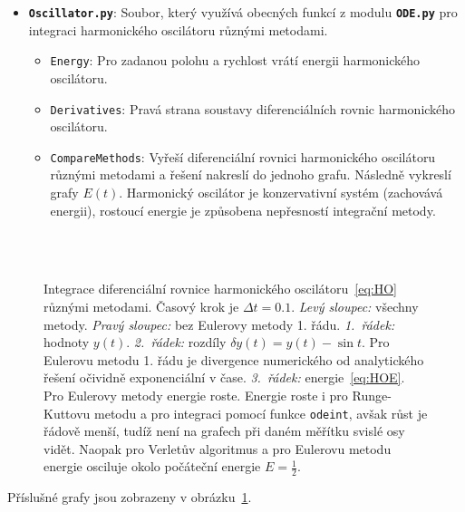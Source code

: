 \documentclass[a4paper,11pt,twoside]{article}
\def\code#1{\textnormal{\texttt{#1}}}
\def\file#1{\textnormal{\textbf{\texttt{#1}}}}
\begin{document}
\begin{solution}
\begin{itemize}
        \item \file{Oscillator.py}:
            Soubor, který využívá obecných funkcí z modulu \file{ODE.py} pro integraci harmonického oscilátoru různými metodami.
            \begin{itemize}
            \item \code{Energy}:
                Pro zadanou polohu a rychlost vrátí energii harmonického oscilátoru.
            \item \code{Derivatives}:
                Pravá strana soustavy diferenciálních rovnic harmonického oscilátoru. 
            \item \code{CompareMethods}:
                Vyřeší diferenciální rovnici harmonického oscilátoru různými metodami a řešení nakreslí do jednoho grafu.
                Následně vykreslí grafy $E(t)$.
                Harmonický oscilátor je konzervativní systém (zachovává energii), rostoucí energie je způsobena ne\-přes\-nos\-tí integrační metody.
            \end{itemize}
        \end{itemize}

        \begin{figure}[!htbp]\label{fig:HO}
            \centering
			\\
			\\
			\caption{
                \protect\small
                Integrace diferenciální rovnice harmonického oscilátoru~\eqref{eq:HO} různými metodami.
                Časový krok je $\Delta t=0.1$.
                \emph{Levý sloupec:} všechny metody.
                \emph{Pravý sloupec:} bez Eulerovy metody 1. řádu.
                \emph{1.~řádek:} hodnoty $y(t)$.
                \emph{2.~řádek:} rozdíly $\delta y(t)=y(t)-\sin{t}$.
                Pro Eulerovu metodu 1. řádu je divergence numerického od analytického řešení očividně exponenciální v čase.
                \emph{3.~řádek:} energie~\eqref{eq:HOE}. 
                Pro Eulerovy metody energie roste.
                Energie roste i pro Runge-Kuttovu metodu a pro integraci pomocí funkce \code{odeint}, avšak růst je řádově menší, tudíž není na grafech při daném měřítku svislé osy vidět.
                Naopak pro Verletův algoritmus a pro  Eulerovu metodu energie osciluje okolo počáteční energie $E=\frac{1}{2}$.
			}	
		\end{figure}

        Příslušné grafy jsou zobrazeny v obrázku~\ref{fig:HO}.
    \end{solution}
\end{document}
